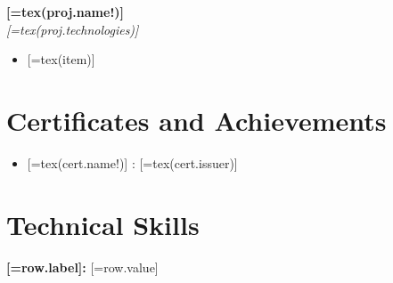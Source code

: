 \documentclass[letterpaper,11pt]{article}
\begin{document}
{\bfseries {[=tex(proj.name!)]}}
\\
{\itshape {[=tex(proj.technologies)]}}

\begin{itemize}
\setlength{\itemsep}{0pt}\setlength{\parsep}{0pt}\setlength{\parskip}{0pt}
\item {[=tex(item)]}
\end{itemize}

\section*{Certificates and Achievements}

\begin{itemize}
\setlength{\itemsep}{0pt}\setlength{\parsep}{0pt}\setlength{\parskip}{0pt}
\item {[=tex(cert.name!)]}%
: {[=tex(cert.issuer)]}%

\end{itemize}

\section*{Technical Skills}

{\bfseries {[=row.label]}:} {[=row.value]}
\\

\end{document}
